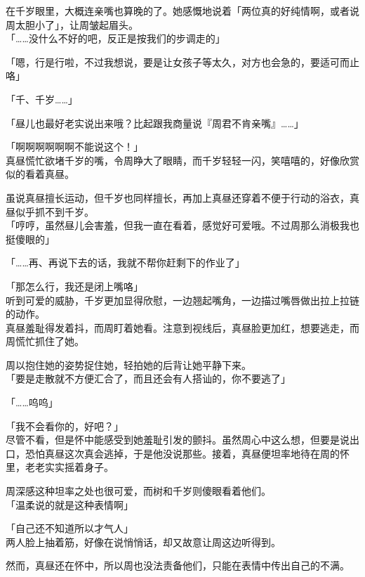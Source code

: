 在千岁眼里，大概连亲嘴也算晚的了。她感慨地说着「两位真的好纯情啊，或者说周太胆小了」，让周皱起眉头。\\

「……没什么不好的吧，反正是按我们的步调走的」

「嗯，行是行啦，不过我想说，要是让女孩子等太久，对方也会急的，要适可而止咯」

「千、千岁……」

「昼儿也最好老实说出来哦？比起跟我商量说『周君不肯亲嘴』……」

「啊啊啊啊啊啊不能说这个！」\\

真昼慌忙欲堵千岁的嘴，令周睁大了眼睛，而千岁轻轻一闪，笑嘻嘻的，好像欣赏似的看着真昼。

虽说真昼擅长运动，但千岁也同样擅长，再加上真昼还穿着不便于行动的浴衣，真昼似乎抓不到千岁。\\

「哼哼，虽然昼儿会害羞，但我一直在看着，感觉好可爱哦。不过周那么消极我也挺傻眼的」

「……再、再说下去的话，我就不帮你赶剩下的作业了」

「那怎么行，我还是闭上嘴咯」\\

听到可爱的威胁，千岁更加显得欣慰，一边翘起嘴角，一边描过嘴唇做出拉上拉链的动作。\\

真昼羞耻得发着抖，而周盯着她看。注意到视线后，真昼脸更加红，想要逃走，而周慌忙抓住了她。

周以抱住她的姿势捉住她，轻拍她的后背让她平静下来。\\

「要是走散就不方便汇合了，而且还会有人搭讪的，你不要逃了」

「……呜呜」

「我不会看你的，好吧？」\\

尽管不看，但是怀中能感受到她羞耻引发的颤抖。虽然周心中这么想，但要是说出口，恐怕真昼这次真会逃掉，于是他没说那些。接着，真昼便坦率地待在周的怀里，老老实实摇着身子。

周深感这种坦率之处也很可爱，而树和千岁则傻眼看着他们。\\

「温柔说的就是这种表情啊」

「自己还不知道所以才气人」\\

两人脸上抽着筋，好像在说悄悄话，却又故意让周这边听得到。

然而，真昼还在怀中，所以周也没法责备他们，只能在表情中传出自己的不满。
